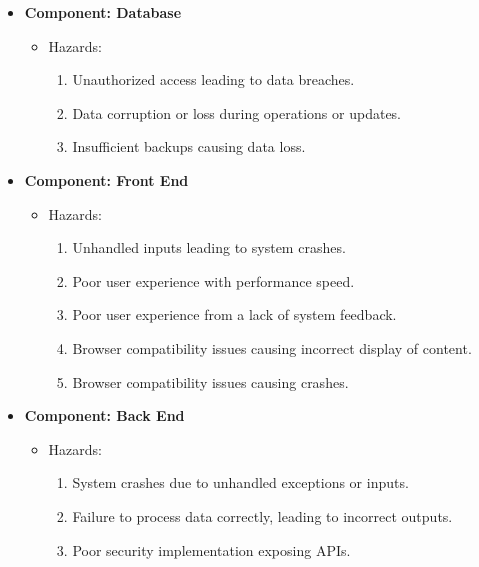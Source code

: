 \documentclass{article}
\begin{document}
\begin{itemize}
    \item \textbf{Component: Database} 
    \begin{itemize}
        \item Hazards:
        \begin{enumerate}
            \item Unauthorized access leading to data breaches.
            \item Data corruption or loss during operations or updates.
            \item Insufficient backups causing data loss.
        \end{enumerate}
    \end{itemize}

    \item \textbf{Component: Front End} 
    \begin{itemize}
        \item Hazards:
        \begin{enumerate}
            \item Unhandled inputs leading to system crashes. 
            \item Poor user experience with performance speed. 
            \item Poor user experience from a lack of system feedback. 
            \item Browser compatibility issues causing incorrect display of content.
            \item Browser compatibility issues causing crashes. 
        \end{enumerate}
    \end{itemize}

    \item \textbf{Component: Back End} 
    \begin{itemize}
        \item Hazards:
        \begin{enumerate}
            \item System crashes due to unhandled exceptions or inputs.
            \item Failure to process data correctly, leading to incorrect outputs.
            \item Poor security implementation exposing APIs.
        \end{enumerate}
    \end{itemize}
    

\end{itemize}
\end{document}
